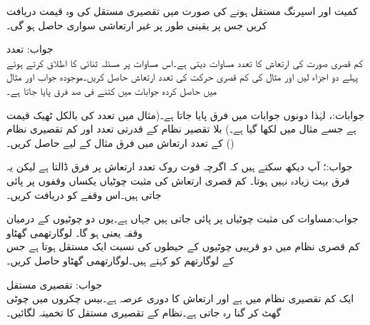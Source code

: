 کمیت  اور اسپرنگ مستقل  ہونے کی صورت میں تقصیری مستقل کی وہ قیمت دریافت کریں جس پر یقینی طور پر غیر ارتعاشی سواری حاصل ہو گی۔

  جواب:
\quad تعدد\\
کم قصری صورت کی ارتعاش کا تعدد   مساوات  دیتی ہے۔اس مساوات پر مسئلہ ثنائی کا اطلاق کرتے ہوئے پہلے دو اجزاء لیں اور  مثال  کی کم قصری حرکت  کی تعدد ارتعاش حاصل کریں۔موجودہ جواب اور مثال میں حاصل کردہ جوابات میں کتنے فی صد فرق پایا جاتا ہے۔

جوابات:،  لہٰذا دونوں جوابات میں  فرق پایا جاتا ہے۔(مثال  میں تعدد کی بالکل ٹھیک قیمت  ہے جسے مثال میں  لکھا گیا ہے۔)
بلا تقصیر نظام کے قدرتی تعدد اور کم تقصیری نظام () کے تعدد ارتعاش میں فرق مثال  کے لیے حاصل کریں۔

جواب:؛ آپ دیکھ سکتے ہیں کہ اگرچہ قوت روک تعدد ارتعاش پر فرق ڈالتا ہے لیکن یہ فرق بہت زیادہ نہیں ہوتا۔
کم قصری ارتعاش کی مثبت چوٹیاں یکساں وقفوں پر پائی جاتی ہیں۔اس وقفے کو دریافت کریں۔ 

جواب:مساوات  کی مثبت چوٹیاں  پر پائی جاتی ہیں جہاں  ہے۔یوں دو چوٹیوں کے درمیان وقفہ  یعنی  ہو گا۔
\quad لوگارتھمی گھٹاو\\
کم قصری نظام میں  دو قریبی چوٹیوں کے حیطوں کی نسبت ایک مستقل  ہوتا ہے جس کے لوگارتھم کو  کہتے ہیں۔لوگارتھمی گھٹاو  حاصل کریں۔ 

جواب:
\quad تقصیری مستقل\\
ایک کم تقصیری نظام میں  ہے اور ارتعاش کا دوری عرصہ  ہے۔بیس چکروں میں چوٹی گھٹ کر  گنا رہ جاتی ہے۔نظام کے تقصیری مستقل کا تخمینہ لگائیں۔

